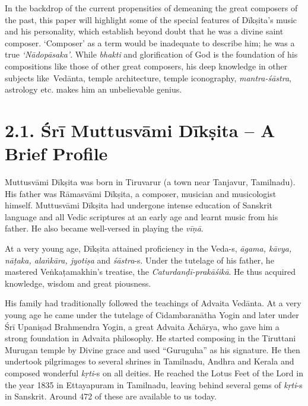 In the backdrop of the current propensities of demeaning the great composers of the past, this paper will highlight some of the special features of Dīkṣita’s music and his personality, which establish beyond doubt that he was a divine saint composer. ‘Composer’ as a term would be inadequate to describe him; he was a true \textit{‘Nādopāsaka’}. While \textit{bhakti} and glorification of God is the foundation of his compositions like those of other great composers, his deep knowledge in other subjects like Vedānta, temple architecture, temple iconography, \textit{mantra-śāstra}, astrology etc. makes him an unbelievable genius.


\vspace{-.3cm}


\section*{2.1. Śrī Muttusvāmi Dīkṣita – A Brief Profile}

Muttusvāmi Dīkṣita was born in Tiruvarur (a town near Tanjavur, Tamilnadu). His father was Rāmasvāmi Dīkṣita, a composer, musician and musicologist himself. Muttusvāmi Dīkṣita had undergone intense education of Sanskrit language and all Vedic scriptures at an early age and learnt music from his father. He also became well-versed in playing the \textit{vīṇā}.

At a very young age, Dīkṣita attained proficiency in the Veda-s, \textit{āgama, kāvya, nāṭaka, alaṅkāra, jyotiṣa} and \textit{śāstra}-s. Under the tutelage of his father, he mastered Veṅkaṭamakhin’s treatise, the \textit{Caturdanḍī-prakāśikā}. He thus acquired knowledge, wisdom and great piousness.

His family had traditionally followed the teachings of Advaita Vedānta. At a very young age he came under the tutelage of Cidambaranātha Yogin and later under Śrī Upaniṣad Brahmendra Yogin, a great Advaita Āchārya, who gave him a strong foundation in Advaita philosophy. He started composing in the Tiruttani Murugan temple by Divine grace and used “Guruguha” as his signature. He then undertook pilgrimages to several shrines in Tamilnadu, Andhra and Kerala and composed wonderful \textit{kṛti}-s on all deities. He reached the Lotus Feet of the Lord in the year 1835 in Ettayapuram in Tamilnadu, leaving behind several gems of \textit{kṛti}-s in Sanskrit. Around 472 of these are available to us today.

